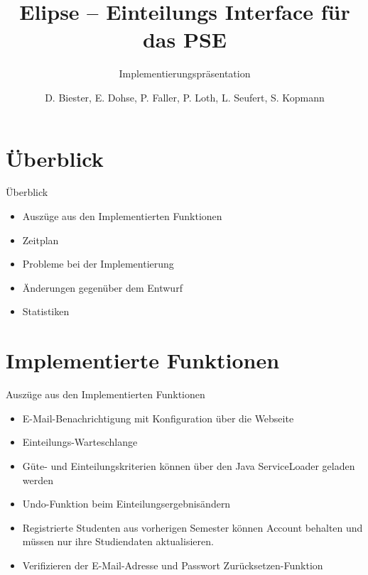 \documentclass[18pt]{beamer}
\title[Elipse]{Elipse -- Einteilungs Interface für das PSE}
\subtitle{Implementierungspräsentation}
\author{D. Biester, E. Dohse, P. Faller, P. Loth, L. Seufert, S. Kopmann}
\institute{IPD Snelting}
\begin{document}

\begin{frame}
\titlepage
\end{frame}

\section{Überblick}
\begin{frame}{Überblick}
\begin{itemize}
  \item Auszüge aus den Implementierten Funktionen
  \item Zeitplan
  \item Probleme bei der Implementierung
  \item Änderungen gegenüber dem Entwurf
  \item Statistiken
\end{itemize}
\end{frame}

\section{Implementierte Funktionen}
\begin{frame}{Auszüge aus den Implementierten Funktionen}
\begin{itemize}
  \item E-Mail-Benachrichtigung mit Konfiguration über die Webseite
  \item Einteilungs-Warteschlange
  \item Güte- und Einteilungskriterien können über den Java ServiceLoader geladen werden
  \item Undo-Funktion beim Einteilungsergebnisändern
  \item Registrierte Studenten aus vorherigen Semester können Account behalten und müssen nur ihre Studiendaten aktualisieren.
  \item Verifizieren der E-Mail-Adresse und Passwort Zurücksetzen-Funktion
\end{itemize}
\end{frame}
\end{document}
